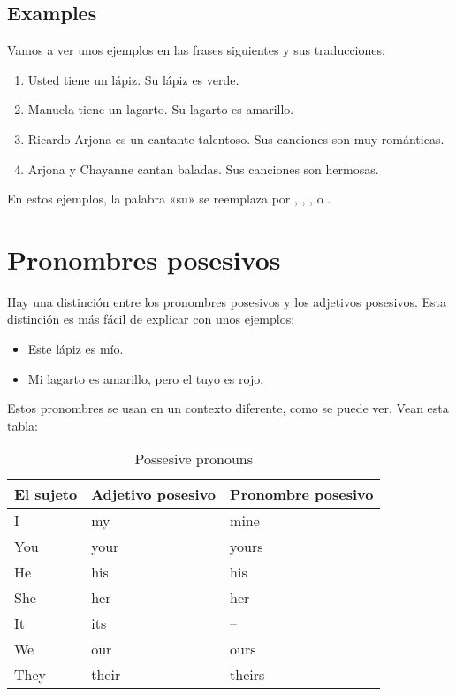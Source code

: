 \subsection{Examples}

Vamos a ver unos ejemplos en las frases siguientes y sus traducciones:

\begin{enumerate}
	\item Usted tiene un lápiz. Su l\'apiz es verde.
		\arr {}
	\item Manuela tiene un lagarto. Su lagarto es amarillo.
		\arr {}
	\item Ricardo Arjona es un cantante talentoso. Sus canciones son muy rom\'anticas.
		\arr {}
	\item Arjona y Chayanne cantan baladas. Sus canciones son hermosas.
		\arr {}
\end{enumerate}

En estos ejemplos, la palabra «su» se reemplaza
por , , , o .

\section{Pronombres posesivos}

Hay una distinci\'on entre los pronombres posesivos y los adjetivos posesivos.
Esta distinci\'on es m\'as f\'acil de explicar con unos ejemplos:

\begin{itemize}
	\item Este l\'apiz es m\'io.
		\arr {}
	\item Mi lagarto es amarillo, pero el tuyo es rojo.
		\arr {}
\end{itemize}

Estos pronombres se usan en un contexto diferente, como se puede ver.
Vean esta tabla:

\begin{table}[H]
	\centering
	\begin{tabular}{lll}
	\toprule
	\textbf{El sujeto} & \textbf{Adjetivo posesivo} & \textbf{Pronombre posesivo} \\
	\midrule
	I & my & mine \\
	You & your & yours \\
	He & his & his \\
	She & her & her \\
	It & its & -- \\
	We & our & ours\\
	They & their & theirs \\
	\bottomrule
	\end{tabular}
	\caption{Possesive pronouns}
\end{table}

